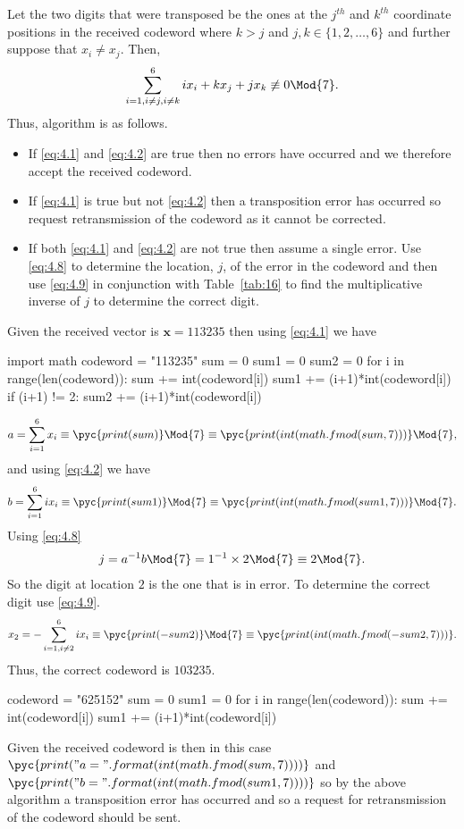 Let the two digits that were transposed be the ones at the $j^{th}$ and $k^{th}$ coordinate positions in the received codeword where $k>j$ and $j,k \in \{1,2,\ldots,6\}$ and further suppose that $x_i \neq x_j$. Then,
\begin{align*}
	\sum_{i=1,i\neq j,i\neq k}^{6}ix_i + kx_j + jx_k \not\equiv 0 \Mod{7}.
\end{align*}
Thus, algorithm is as follows.
\begin{itemize}
	\item If \eqref{eq:4.1} and \eqref{eq:4.2} are true then no errors have occurred and we therefore accept the received codeword.
	\item If \eqref{eq:4.1} is true but not \eqref{eq:4.2} then a transposition error has occurred so request retransmission of the codeword as it cannot be corrected.
	\item If both \eqref{eq:4.1} and \eqref{eq:4.2} are not true then assume a single error. Use \eqref{eq:4.8} to determine the location, $j$, of the error in the codeword and then use \eqref{eq:4.9} in conjunction with Table~\ref{tab:16} to find the multiplicative inverse of $j$ to determine the correct digit.
\end{itemize}
\qsubpart
Given the received vector is $\bm{x} = 113235$ then using \eqref{eq:4.1} we have
\begin{pycode}
import math
codeword = "113235"
sum = 0
sum1 = 0
sum2 = 0
for i in range(len(codeword)):
	sum += int(codeword[i])
	sum1 += (i+1)*int(codeword[i])
	if (i+1) != 2:
		sum2 += (i+1)*int(codeword[i])
\end{pycode}
\begin{align*}
	a = \sum_{i=1}^{6} x_i \equiv \pyc{print(sum)} \Mod{7} \equiv \pyc{print(int(math.fmod(sum,7)))}  \Mod{7},
\end{align*}
and using \eqref{eq:4.2} we have
\begin{align*}
	b = \sum_{i=1}^{6} ix_i \equiv \pyc{print(sum1)} \Mod{7} \equiv \pyc{print(int(math.fmod(sum1,7)))} \Mod{7}.
\end{align*}
Using \eqref{eq:4.8}
\begin{align*}
	j = a^{-1} b \Mod{7} = 1^{-1}\times 2 \Mod{7} \equiv 2 \Mod{7}.
\end{align*}
So the digit at location $2$ is the one that is in error. To determine the correct digit use \eqref{eq:4.9}.
\begin{align*}
	x_2 = -\sum_{i=1,i\neq 2}^{6} ix_i \equiv \pyc{print(-sum2)} \Mod{7} \equiv \pyc{print(int(math.fmod(-sum2,7)))}.
\end{align*}
Thus, the correct codeword is $103235$.
\begin{pycode}
codeword = "625152"
sum  = 0
sum1 = 0
for i in range(len(codeword)):
	sum += int(codeword[i])
	sum1 += (i+1)*int(codeword[i])
\end{pycode}
\qsubpart
Given the received codeword is  then in this case 
$\pyc{print("a={}".format(int(math.fmod(sum,7))))}$ and 
$\pyc{print("b={}".format(int(math.fmod(sum1,7))))}$ so by the above algorithm a transposition error has occurred and so a request for retransmission of the codeword should be sent.

